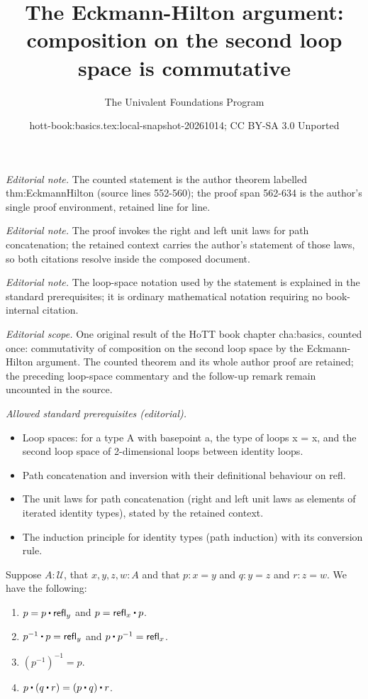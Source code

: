 \documentclass[10pt,a4paper]{article}
\title{The Eckmann-Hilton argument: composition on the second loop space is commutative}
\author{The Univalent Foundations Program}
\date{hott-book:basics.tex:local-snapshot-20261014; CC BY-SA 3.0 Unported}
\newcounter{chapter}
\providecommand{\index}[1]{}
\newcommand{\refl}[1]{\ensuremath{\mathsf{refl}_{#1}}\xspace}
\newcommand{\ct}{%
  \mathchoice{\mathbin{\raisebox{0.5ex}{$\displaystyle\centerdot$}}}%
             {\mathbin{\raisebox{0.5ex}{$\centerdot$}}}%
             {\mathbin{\raisebox{0.25ex}{$\scriptstyle\,\centerdot\,$}}}%
             {\mathbin{\raisebox{0.1ex}{$\scriptscriptstyle\,\centerdot\,$}}}
}
\newcommand{\opp}[1]{\mathord{{#1}^{-1}}}
\newcommand{\UU}{\ensuremath{\mathcal{U}}\xspace}
\let\type\UU
\theoremstyle{definition}
\theoremstyle{remark}
\numberwithin{equation}{section}
\begin{document}
\maketitle
\noindent\textit{Editorial note.} The counted statement is the author theorem labelled thm:EckmannHilton (source lines 552-560); the proof span 562-634 is the author's single proof environment, retained line for line.\par\medskip
\noindent\textit{Editorial note.} The proof invokes the right and left unit laws for path concatenation; the retained context carries the author's statement of those laws, so both citations resolve inside the composed document.\par\medskip
\noindent\textit{Editorial note.} The loop-space notation used by the statement is explained in the standard prerequisites; it is ordinary mathematical notation requiring no book-internal citation.\par\medskip
\noindent\textit{Editorial scope.} One original result of the HoTT book chapter cha:basics, counted once: commutativity of composition on the second loop space by the Eckmann-Hilton argument. The counted theorem and its whole author proof are retained; the preceding loop-space commentary and the follow-up remark remain uncounted in the source.\par\medskip
\noindent\textit{Allowed standard prerequisites (editorial).}\begin{itemize}
\item Loop spaces: for a type A with basepoint a, the type of loops x = x, and the second loop space of 2-dimensional loops between identity loops.
\item Path concatenation and inversion with their definitional behaviour on refl.
\item The unit laws for path concatenation (right and left unit laws as elements of iterated identity types), stated by the retained context.
\item The induction principle for identity types (path induction) with its conversion rule.
\end{itemize}\medskip
\begin{lem}\label{thm:omg}%
  \index{associativity!of path concatenation}%
  \index{unit!law for path concatenation}%
  Suppose $A:\type$, that $x,y,z,w:A$ and that $p:x= y$ and $q:y = z$ and $r:z=w$.
  We have the following:
  \begin{enumerate}
  \item $p= p\ct \refl{y}$ and $p = \refl{x} \ct p$.\label{item:omg1}
  \item $\opp{p}\ct p=  \refl{y}$ and $p\ct \opp{p}= \refl{x}$.\label{item:omg2}
  \item $\opp{(\opp{p})}= p$.\label{item:omg3}
  \item $p\ct (q\ct r)=  (p\ct q)\ct r$.\label{item:omg4}
  \end{enumerate}
\end{lem}
\end{document}
